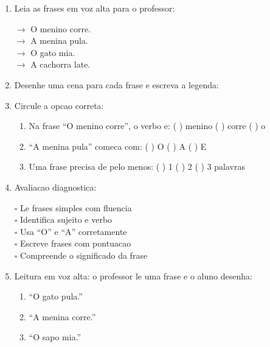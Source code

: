 \begin{exercicio}
\begin{enumerate}[resume]
  \item Leia as frases em voz alta para o professor:
  \begin{center}
  $\rightarrow$ O menino corre.\\
  $\rightarrow$ A menina pula.\\
  $\rightarrow$ O gato mia.\\
  $\rightarrow$ A cachorra late.
  \end{center}

  \item Desenhe uma cena para cada frase e escreva a legenda:
  \begin{center}
  \end{center}

  \item Circule a opcao correta:
  \begin{enumerate}[label=(\alph*)]
    \item Na frase ``O menino corre'', o verbo e: ( ) menino ( ) corre ( ) o
    \item ``A menina pula'' comeca com: ( ) O ( ) A ( ) E
    \item Uma frase precisa de pelo menos: ( ) 1 ( ) 2 ( ) 3 palavras
  \end{enumerate}

  \item Avaliacao diagnostica:
  \begin{center}
  $\square$ Le frases simples com fluencia\\
  $\square$ Identifica sujeito e verbo\\
  $\square$ Usa ``O'' e ``A'' corretamente\\
  $\square$ Escreve frases com pontuacao\\
  $\square$ Compreende o significado da frase
  \end{center}

  \item Leitura em voz alta: o professor le uma frase e o aluno desenha:
  \begin{enumerate}[label=\alph*)]
    \item ``O gato pula.''
    \item ``A menina corre.''
    \item ``O sapo mia.''
  \end{enumerate}
\end{enumerate}
\end{exercicio}

